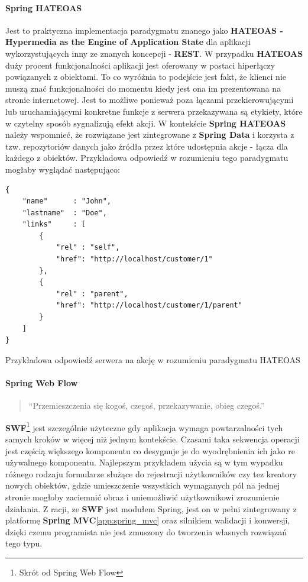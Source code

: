 	\paragraph{Spring HATEOAS}\cite{spring_hateos}
	Jest to praktyczna implementacja paradygmatu znanego jako \textbf{HATEOAS - Hypermedia as the Engine of Application State} dla aplikacji wykorzystujących inny ze znanych koncepcji - \textbf{REST}. W przypadku \textbf{HATEOAS} duży procent funkcjonalności aplikacji jest oferowany w postaci hiperłączy powiązanych z obiektami. To co wyróżnia to podejście jest fakt, że klienci nie muszą znać funkcjonalności do momentu kiedy jest ona im prezentowana na stronie internetowej. Jest to możliwe ponieważ poza łączami przekierowującymi lub uruchamiającymi konkretne funkcje z serwera przekazywana są etykiety, które w czytelny sposób sygnalizują efekt akcji. 
	W kontekście \textbf{Spring HATEOAS} należy wspomnieć, że rozwiązane jest zintegrowane z \textbf{Spring Data} i korzysta z tzw. repozytoriów danych jako źródła przez które udostępnia akcje - łącza dla każdego z obiektów. Przykładowa odpowiedź w rozumieniu tego paradygmatu mogłaby wyglądać następująco:
	\begin{code}
		\begin{verbatim}
{
    "name"	   	: "John",
    "lastname"	: "Doe",
    "links"	   	: [
        {
            "rel" : "self",
            "href": "http://localhost/customer/1"
        },
        {
            "rel" : "parent",
            "href": "http://localhost/customer/1/parent"
        }
    ]
}
		\end{verbatim}
		\label{app:spring_hetoas_response_example}
		\caption[Spring HATEOAS - Przykładowa odpowiedź]{Przykładowa odpowiedź serwera na akcję w rozumieniu paradygmatu HATEOAS}
	\end{code}

	\paragraph{Spring Web Flow}	
	\begin{quotation}
		``Przemieszczenia się kogoś, czegoś, przekazywanie, obieg czegoś.''\cite{polish_dictionary}
	\end{quotation}
	\textbf{SWF}\footnote{Skrót od Spring Web Flow} jest szczególnie użyteczne gdy aplikacja wymaga powtarzalności tych samych kroków
	w więcej niż jednym kontekście. Czasami taka sekwencja operacji jest częścią większego komponentu co desygnuje je do wyodrębnienia
	ich jako re używalnego komponentu. Najlepszym przykładem użycia są w tym wypadku różnego rodzaju formularze służące do rejestracji
	użytkowników czy tez kreatory nowych obiektów, gdzie umieszczenie wszystkich wymaganych pól na jednej stronie mogłoby zaciemnić obraz
	i uniemożliwić użytkownikowi zrozumienie działania. 
	Z racji, ze \textbf{SWF} jest modułem Spring, jest on w pełni zintegrowany z platformę \textbf{Spring MVC}\ref{app:spring_mvc} oraz
	silnikiem walidacji i konwersji, dzięki czemu programista nie jest zmuszony do tworzenia własnych rozwiązań tego typu. 
	
